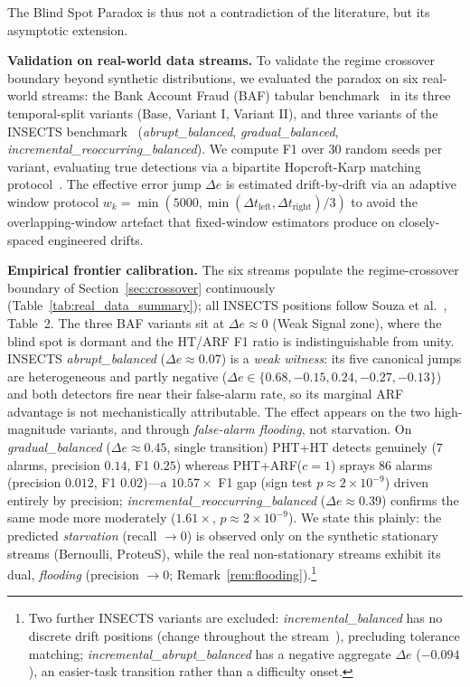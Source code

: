 \documentclass[10pt,conference]{IEEEtran}
\theoremstyle{definition}
\begin{document}
The Blind Spot Paradox is thus not a contradiction of the literature, but its asymptotic extension.

\textbf{Validation on real-world data streams.}
To validate the regime crossover boundary beyond synthetic distributions, we evaluated the paradox on six real-world streams: the Bank Account Fraud (BAF) tabular benchmark~\cite{jesus_baf_2022} in its three temporal-split variants (Base, Variant I, Variant II), and three variants of the INSECTS benchmark~\cite{souza_insects_2020} (\emph{abrupt\_balanced}, \emph{gradual\_balanced}, \emph{incremental\_reoccurring\_balanced}). We compute F1 over 30 random seeds per variant, evaluating true detections via a bipartite Hopcroft-Karp matching protocol~\cite{hopcroft_karp_1973}. The effective error jump $\Delta e$ is estimated drift-by-drift via an adaptive window protocol $w_k = \min(5000, \min(\Delta t_{\mathrm{left}}, \Delta t_{\mathrm{right}})/3)$ to avoid the overlapping-window artefact that fixed-window estimators produce on closely-spaced engineered drifts.

\textbf{Empirical frontier calibration.}
The six streams populate the regime-crossover boundary of Section~\ref{sec:crossover} continuously (Table~\ref{tab:real_data_summary}); all INSECTS positions follow Souza et al.~\cite{souza_insects_2020}, Table~2. The three BAF variants sit at $\Delta e \approx 0$ (Weak Signal zone), where the blind spot is dormant and the HT/ARF F1 ratio is indistinguishable from unity. INSECTS \emph{abrupt\_balanced} ($\Delta e \approx 0.07$) is a \emph{weak witness}: its five canonical jumps are heterogeneous and partly negative ($\Delta e \in \{0.68, -0.15, 0.24, -0.27, -0.13\}$) and both detectors fire near their false-alarm rate, so its marginal ARF advantage is not mechanistically attributable. The effect appears on the two high-magnitude variants, and through \emph{false-alarm flooding}, not starvation. On \emph{gradual\_balanced} ($\Delta e \approx 0.45$, single transition) PHT+HT detects genuinely ($7$ alarms, precision $0.14$, F1 $0.25$) whereas PHT+ARF($c{=}1$) sprays $86$ alarms (precision $0.012$, F1 $0.02$)---a $10.57\times$ F1 gap (sign test $p \approx 2 \times 10^{-9}$) driven entirely by precision; \emph{incremental\_reoccurring\_balanced} ($\Delta e \approx 0.39$) confirms the same mode more moderately ($1.61\times$, $p \approx 2 \times 10^{-9}$). We state this plainly: the predicted \emph{starvation} (recall $\to 0$) is observed only on the synthetic stationary streams (Bernoulli, ProteuS), while the real non-stationary streams exhibit its dual, \emph{flooding} (precision $\to 0$; Remark~\ref{rem:flooding}).\footnote{Two further INSECTS variants are excluded: \emph{incremental\_balanced} has no discrete drift positions (change throughout the stream~\cite{souza_insects_2020}), precluding tolerance matching; \emph{incremental\_abrupt\_balanced} has a negative aggregate $\Delta e$ ($-0.094$), an easier-task transition rather than a difficulty onset.}
\end{document}
